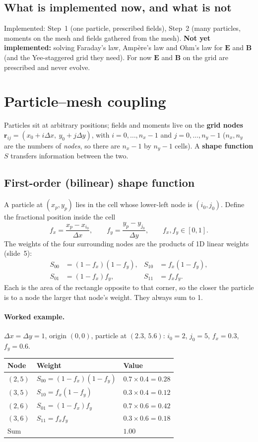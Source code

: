\documentclass[11pt,a4paper]{article}
\newcommand{\EE}{\mathbf{E}}
\newcommand{\BB}{\mathbf{B}}
\begin{document}
\subsection{What is implemented now, and what is not}
Implemented: Step~1 (one particle, prescribed fields), Step~2 (many particles, moments on the mesh
and fields gathered from the mesh). \textbf{Not yet implemented:} solving Faraday's law, Amp\`ere's
law and Ohm's law for $\EE$ and $\BB$ (and the Yee-staggered grid they need). For now $\EE$ and
$\BB$ on the grid are prescribed and never evolve.

\section{Particle--mesh coupling}
\label{sec:pm}

Particles sit at arbitrary positions; fields and moments live on the \textbf{grid nodes}
$\mathbf r_{ij}=(x_0+i\Delta x,\ y_0+j\Delta y)$, with $i=0,\dots,n_x-1$ and $j=0,\dots,n_y-1$
($n_x,n_y$ are the numbers of \emph{nodes}, so there are $n_x-1$ by $n_y-1$ cells). A
\textbf{shape function} $S$ transfers information between the two.

\subsection{First-order (bilinear) shape function}
A particle at $(x_p,y_p)$ lies in the cell whose lower-left node is $(i_0,j_0)$. Define the
fractional position inside the cell
\[
  f_x=\frac{x_p-x_{i_0}}{\Delta x},\qquad f_y=\frac{y_p-y_{j_0}}{\Delta y},\qquad f_x,f_y\in[0,1].
\]
The weights of the four surrounding nodes are the products of 1D linear weights (slide~5):
\begin{align}
  S_{00}&=(1-f_x)(1-f_y), & S_{10}&=f_x(1-f_y),\nonumber\\
  S_{01}&=(1-f_x)f_y,     & S_{11}&=f_xf_y .
\end{align}
Each is the area of the rectangle opposite to that corner, so the closer the particle is to a
node the larger that node's weight. They always sum to 1.

\paragraph{Worked example.} $\Delta x=\Delta y=1$, origin $(0,0)$, particle at $(2.3,\,5.6)$:
$i_0=2$, $j_0=5$, $f_x=0.3$, $f_y=0.6$.
\begin{center}
\begin{tabular}{lll}
\toprule
Node & Weight & Value \\
\midrule
$(2,5)$ & $S_{00}=(1-f_x)(1-f_y)$ & $0.7\times0.4=0.28$\\
$(3,5)$ & $S_{10}=f_x(1-f_y)$     & $0.3\times0.4=0.12$\\
$(2,6)$ & $S_{01}=(1-f_x)f_y$     & $0.7\times0.6=0.42$\\
$(3,6)$ & $S_{11}=f_xf_y$         & $0.3\times0.6=0.18$\\
\midrule
Sum & & $1.00$\\
\bottomrule
\end{tabular}
\end{center}
\end{document}
